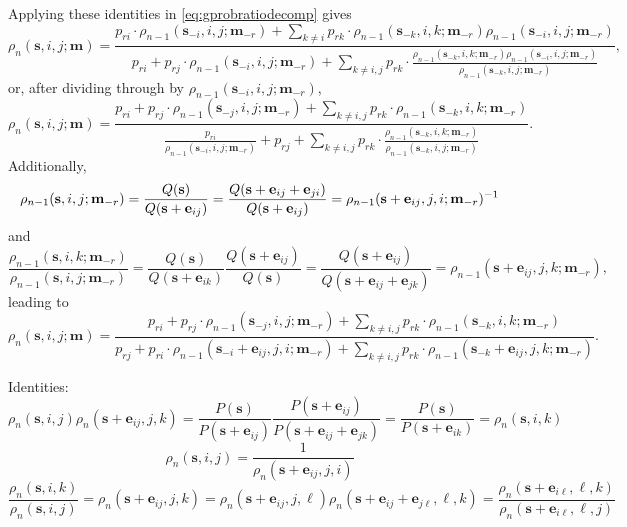 \documentclass[11pt,draft]{article}
\newcommand{\sv}{\mathbf{s}}
\newcommand{\mv}{\mathbf{m}}
\newcommand{\ev}{\mathbf{e}}
\begin{document}
Applying these identities in \eqref{eq:gprobratiodecomp} gives
\begin{equation} \label{eq:gprobratiodecomprho}
\rho_n(\sv, i, j; \mv) = \frac{
p_{ri}\cdot\rho_{n-1}(\sv_{-i}, i, j; \mv_{-r}) +
\displaystyle\sum_{k \neq i} p_{rk}\cdot
\rho_{n-1}(\sv_{-k}, i, k; \mv_{-r})\rho_{n-1}(\sv_{-i}, i, j; \mv_{-r}) }{
p_{ri} + p_{rj}\cdot\rho_{n-1}(\sv_{-i}, i, j; \mv_{-r}) +
\displaystyle\sum_{k \neq i,j} p_{rk}\cdot
\frac{\rho_{n-1}(\sv_{-k}, i, k; \mv_{-r})
\rho_{n-1}(\sv_{-i}, i, j; \mv_{-r})}{\rho_{n-1}(\sv_{-k}, i, j; \mv_{-r})}
},
\end{equation}
or, after dividing through by $\rho_{n-1}(\sv_{-i}, i, j; \mv_{-r})$,
\begin{equation*}
\rho_n(\sv, i, j; \mv) = \frac{
p_{ri} + p_{rj}\cdot\rho_{n-1}(\sv_{-j}, i, j; \mv_{-r}) +
\displaystyle\sum_{k \neq i,j} p_{rk}\cdot\rho_{n-1}(\sv_{-k}, i, k; \mv_{-r})}{
\displaystyle\frac{p_{ri}}{\rho_{n-1}(\sv_{-i}, i, j; \mv_{-r})} + p_{rj} +
\displaystyle\sum_{k \neq i,j} p_{rk}\cdot
\frac{\rho_{n-1}(\sv_{-k}, i, k; \mv_{-r})}{
\rho_{n-1}(\sv_{-k}, i, j; \mv_{-r})} }.
\end{equation*}
Additionally,
\[ \rho_{n-1}(\sv, i, j; \mv_{-r}) = \frac{Q(\sv)}{Q(\sv + \ev_{ij})} =
\frac{Q(\sv + \ev_{ij} + \ev_{ji})}{Q(\sv + \ev_{ij})} =
\inv{\rho_{n-1}(\sv + \ev_{ij}, j, i; \mv_{-r})} \]
and
\[ \frac{\rho_{n-1}(\sv, i, k; \mv_{-r})}{
\rho_{n-1}(\sv, i, j; \mv_{-r})} = 
\frac{Q(\sv)}{Q(\sv + \ev_{ik})}
\frac{Q(\sv + \ev_{ij})}{Q(\sv)} =
\frac{Q(\sv + \ev_{ij})}{Q(\sv + \ev_{ij} + \ev_{jk})} =
\rho_{n-1}(\sv + \ev_{ij}, j, k; \mv_{-r}),
\]
leading to
\begin{equation*}
\rho_n(\sv, i, j; \mv) = \frac{
p_{ri} + p_{rj}\cdot\rho_{n-1}(\sv_{-j}, i, j; \mv_{-r}) +
\displaystyle\sum_{k \neq i,j} p_{rk}\cdot\rho_{n-1}(\sv_{-k}, i, k; \mv_{-r})}{
p_{rj} + p_{ri}\cdot\rho_{n-1}(\sv_{-i} + \ev_{ij}, j, i; \mv_{-r}) +
\displaystyle\sum_{k \neq i,j} p_{rk}\cdot
\rho_{n-1}(\sv_{-k} + \ev_{ij}, j, k; \mv_{-r}) }.
\end{equation*}

\hrulefill

Identities:
\begin{equation}
\rho_n(\sv, i, j)\rho_n(\sv + \ev_{ij}, j, k) =
\frac{P(\sv)}{P(\sv + \ev_{ij})}
\frac{P(\sv + \ev_{ij})}{P(\sv + \ev_{ij} + \ev_{jk})} =
\frac{P(\sv)}{P(\sv + \ev_{ik})} = \rho_n(\sv, i, k)
\end{equation}
\begin{equation}
\rho_n(\sv, i, j) = \frac{1}{\rho_n(\sv + \ev_{ij}, j, i)}
\end{equation}
\begin{equation}
\frac{\rho_n(\sv, i, k)}{\rho_n(\sv, i, j)} = \rho_n(\sv + \ev_{ij}, j, k) =
\rho_n(\sv + \ev_{ij}, j, \ell)\rho_n(\sv + \ev_{ij} + \ev_{j\ell}, \ell, k) =
\frac{\rho_n(\sv + \ev_{i\ell}, \ell, k)}{\rho_n(\sv + \ev_{i\ell}, \ell, j)}
\end{equation}
\end{document}
